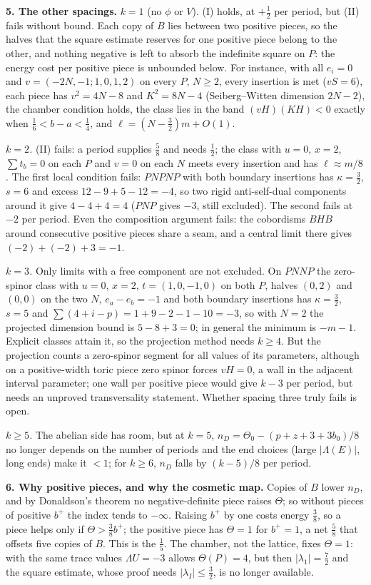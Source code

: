 \documentclass[10pt]{amsart}
\newcommand{\head}[1]{\par\vspace{2pt}\noindent\textbf{#1}\enspace}
\begin{document}
\head{5. The other spacings.}
\emph{$k=1$} (no $\phi$ or $V$). (I) holds, at $+\frac12$ per period, but (II) fails without bound. Each copy of $B$ lies between two positive pieces, so the halves that the square estimate reserves for one positive piece belong to the other, and nothing negative is left to absorb the indefinite square on $P$: the energy cost per positive piece is unbounded below. For instance, with all $e_i=0$ and $v=(-2N,-1;1,0,1,2)$ on every $P$, $N\ge2$, every insertion is met ($vS=6$), each piece has $v^2=4N-8$ and $K^2=8N-4$ (Seiberg--Witten dimension $2N-2$), the chamber condition holds, the class lies in the band $(vH)(KH)<0$ exactly when $\frac16<b-a<\frac14$, and $\ell=(N-\frac32)m+O(1)$.

\emph{$k=2$.} (II) fails: a period supplies $\frac58$ and needs $\frac12$; the class with $u=0$, $x=2$, $\sum t_b=0$ on each $P$ and $v=0$ on each $N$ meets every insertion and has $\ell\approx m/8$. The first local condition fails: $PNPNP$ with both boundary insertions has $\kappa=\frac32$, $s=6$ and excess $12-9+5-12=-4$, so two rigid anti-self-dual components around it give $4-4+4=4$ ($PNP$ gives $-3$, still excluded). The second fails at $-2$ per period. Even the composition argument fails: the cobordisms $BHB$ around consecutive positive pieces share a seam, and a central limit there gives $(-2)+(-2)+3=-1$.

\emph{$k=3$.} Only limits with a free component are not excluded. On $PNNP$ the zero-spinor class with $u=0$, $x=2$, $t=(1,0,-1,0)$ on both $P$, halves $(0,2)$ and $(0,0)$ on the two $N$, $e_a-e_b=-1$ and both boundary insertions has $\kappa=\frac32$, $s=5$ and $\sum(4+i-p)=1+9-2-1-10=-3$, so with $N=2$ the projected dimension bound is $5-8+3=0$; in general the minimum is $-m-1$. Explicit classes attain it, so the projection method needs $k\ge4$. But the projection counts a zero-spinor segment for all values of its parameters, although on a positive-width toric piece zero spinor forces $vH=0$, a wall in the adjacent interval parameter; one wall per positive piece would give $k-3$ per period, but needs an unproved transversality statement. Whether spacing three truly fails is open.

\emph{$k\ge5$.} The abelian side has room, but at $k=5$, $n_D=\Theta_0-(p+z+3+3b_0)/8$ no longer depends on the number of periods and the end choices (large $|\Lambda(E)|$, long ends) make it $<1$; for $k\ge6$, $n_D$ falls by $(k-5)/8$ per period.

\head{6. Why positive pieces, and why the cosmetic map.}
Copies of $B$ lower $n_D$, and by Donaldson's theorem no negative-definite piece raises $\Theta$; so without pieces of positive $b^+$ the index tends to $-\infty$. Raising $b^+$ by one costs energy $\frac38$, so a piece helps only if $\Theta>\frac38b^+$; the positive piece has $\Theta=1$ for $b^+=1$, a net $\frac58$ that offsets five copies of $B$. This is the $\frac15$. The chamber, not the lattice, fixes $\Theta=1$: with the same trace values $\Lambda U=-3$ allows $\Theta(P)=4$, but then $|\lambda_1|=\frac72$ and the square estimate, whose proof needs $|\lambda_I|\le\frac32$, is no longer available.
\end{document}
